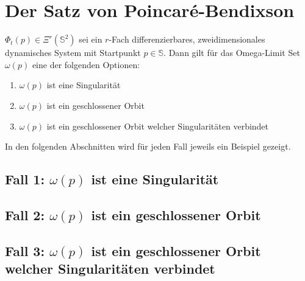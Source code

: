 \section{Der Satz von Poincaré-Bendixson} \label{poinbendix:section:poinbendix}



\begin{satz}
\label{poinbendix:satz:poinbendix}
$\Phi_t(p) \in \Xi^r(\mathbb{S}^2)$ sei ein $r$-Fach differenzierbares, zweidimensionales dynamisches System mit Startpunkt $p \in \mathbb{S}$.
Dann gilt für das Omega-Limit Set $\omega(p)$ eine der folgenden Optionen:
\begin{enumerate}
\item $\omega(p)$ ist eine Singularität
\item $\omega(p)$ ist ein geschlossener Orbit
\item $\omega(p)$ ist ein geschlossener Orbit welcher Singularitäten verbindet
\end{enumerate}
\end{satz}

In den folgenden Abschnitten wird für jeden Fall jeweils ein Beispiel gezeigt.

\subsection{Fall 1: $\omega(p)$ ist eine Singularität} \label{poinbendix:subsection:fall1}
\subsection{Fall 2: $\omega(p)$ ist ein geschlossener Orbit} \label{poinbendix:subsection:fall2}
\subsection{Fall 3: $\omega(p)$ ist ein geschlossener Orbit welcher Singularitäten verbindet} \label{poinbendix:subsection:fall3}

